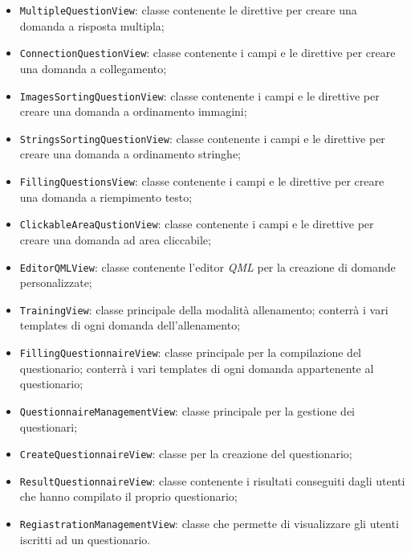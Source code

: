 \begin{itemize}
\begin{itemize}
		\item \texttt{MultipleQuestionView}: classe contenente le direttive per creare una domanda a risposta multipla;
		\item \texttt{ConnectionQuestionView}: classe contenente i campi e le direttive per creare una domanda a collegamento;
		\item \texttt{ImagesSortingQuestionView}: classe contenente i campi e le direttive per creare una domanda a ordinamento immagini;
		\item \texttt{StringsSortingQuestionView}: classe contenente i campi e le direttive per creare una domanda a ordinamento stringhe;
		\item \texttt{FillingQuestionsView}: classe contenente i campi e le direttive per creare una domanda a riempimento testo;
		\item \texttt{ClickableAreaQustionView}: classe contenente i campi e le direttive per creare una domanda ad area cliccabile;
		\item \texttt{EditorQMLView}: classe contenente l'editor \textit{QML} per la creazione di domande personalizzate;
		\item \texttt{TrainingView}: classe principale della modalità allenamento; conterrà i vari templates di ogni domanda dell'allenamento;
		\item \texttt{FillingQuestionnaireView}: classe principale per la compilazione del questionario; conterrà i vari templates di ogni domanda appartenente al questionario;
		\item \texttt{QuestionnaireManagementView}: classe principale per la gestione dei questionari;
		\item \texttt{CreateQuestionnaireView}: classe per la creazione del questionario;
		\item \texttt{ResultQuestionnaireView}: classe contenente i risultati conseguiti dagli utenti che hanno compilato il proprio questionario;
		\item \texttt{RegiastrationManagementView}: classe che permette di visualizzare gli utenti iscritti ad un questionario.
	\end{itemize}
\end{itemize}